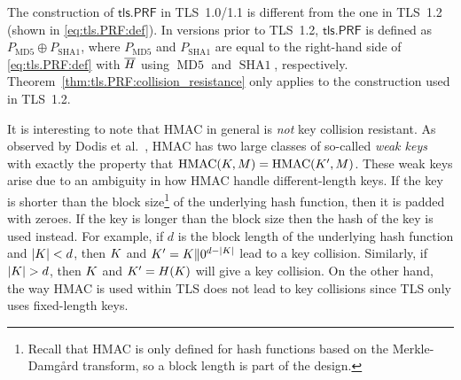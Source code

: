\begin{remark}\label{remark:EAP-TLS:tls.PRF:key_collision}
The construction of $\mathsf{tls.PRF}$ in TLS~1.0/1.1 is different from the one in TLS~1.2
(shown in \cref{eq:tls.PRF:def}).
In versions prior to TLS~1.2,
$\mathsf{tls.PRF}$ is defined as $P_{\mathrm{MD5}} \oplus P_{\mathrm{SHA1}}$,
where $P_{\mathrm{MD5}}$ and $P_{\mathrm{SHA1}}$ are equal to the right-hand side of \cref{eq:tls.PRF:def} with $\overline{H}$ using $\operatorname{\mathrm{MD5}}$ and $\operatorname{\mathrm{SHA1}}$,
respectively. 
Theorem~\ref{thm:tls.PRF:collision_resistance} only applies to the construction used in TLS~1.2.
\end{remark}

\begin{remark}
It is interesting to note that HMAC in general is \emph{not} key collision resistant. 
As observed by Dodis et al.~\cite{C:DRST12},
HMAC has two large classes of so-called \emph{weak keys} with exactly the property that $\operatorname{HMAC}(K, M) = \operatorname{HMAC}(K', M)$.
These weak keys arise due to an ambiguity in how HMAC handle different-length keys.
If the key is shorter than the block size\footnote{Recall
that HMAC is only defined for hash functions based on the Merkle-Damgård transform,
so a block length is part of the design.
} of the underlying hash function,
then it is padded with zeroes.
If the key is longer than the block size then the hash of the key is used instead.
For example,
if $d$ is the block length of the underlying hash function and $| K | < d$,
then $K$ and $K' = K \| 0^{d - |K |}$ lead to a key collision.
Similarly,
if $| K | > d$,
then $K$ and $K' = H(K)$ will give a key collision.
On the other hand,
the way HMAC is used within TLS does not lead to key collisions since TLS only uses fixed-length keys.
\end{remark}

